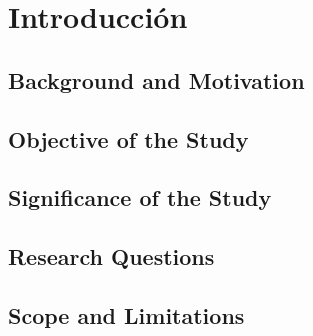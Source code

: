 \documentclass[../Main.tex]{subfiles}
\begin{document}
\section{Introducción}

\lipsum[1] %

\subsection{Background and Motivation}

\lipsum[2-3] %

\subsection{Objective of the Study}

\lipsum[4-5] %

\subsection{Significance of the Study}

\lipsum[6-7] %

\subsection{Research Questions}

\lipsum[8] %

\subsection{Scope and Limitations}
\biblio %
\end{document}
